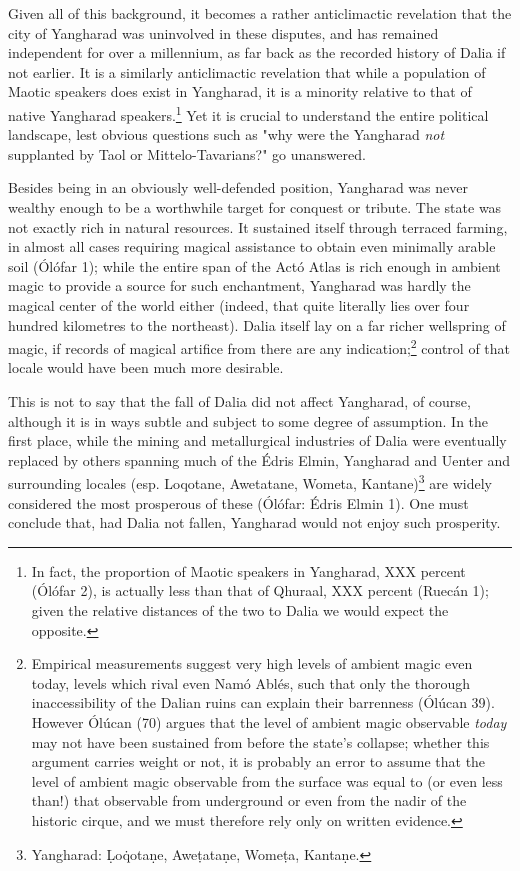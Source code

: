 \documentclass{article}
\begin{document}
{Given all of this background, it becomes a rather anticlimactic revelation that the city of Yangharad was uninvolved in these disputes, and has remained
independent for over a millennium, as far back as the recorded history of Dalia if not earlier. It is a similarly anticlimactic revelation that while a population of Maotic speakers does exist in Yangharad, it is a minority relative to that of native Yangharad speakers.\footnote{In fact, the proportion of Maotic speakers in Yangharad, XXX percent (Ólófar 2), is actually less than that of Qhuraal, XXX percent (Ruecán 1); given the relative distances of the two to Dalia we would expect the opposite.} Yet it is crucial to understand the entire political landscape, lest obvious questions such as "why were the Yangharad \emph{not} supplanted by Taol or Mittelo-Tavarians?" go unanswered.


Besides being in an obviously well-defended position, Yangharad was never
wealthy enough to be a worthwhile target for conquest or tribute. The state was not exactly rich in natural resources. It sustained itself through terraced farming, in almost all cases requiring magical assistance to obtain even minimally arable soil (Ólófar 1); while the entire span of the Actó Atlas is rich enough in ambient magic to provide a source for such enchantment, Yangharad was hardly the magical center of the world either (indeed, that quite literally lies over four hundred kilometres to the northeast). Dalia itself lay on a far richer wellspring of magic, if records of magical artifice from there are any indication;\footnote{Empirical measurements suggest very high levels of ambient magic even today, levels which rival even Namó Ablés, such that only the thorough inaccessibility of the Dalian ruins can explain their barrenness (Ólúcan 39). However Ólúcan (70) argues that the level of ambient magic observable \emph{today} may not have been sustained from before the state's collapse; whether this argument carries weight or not, it is probably an error to assume that the level of ambient magic observable from the surface was equal to (or even less than!) that observable from underground or even from the nadir of the historic cirque, and we must therefore rely only on written evidence.} control of that locale would have been much more desirable.

This is not to say that the fall of Dalia did not affect Yangharad, of course, although it is in ways subtle and subject to some degree of assumption. In the first place, while the mining and metallurgical industries of Dalia were eventually replaced by others spanning much of the Édris Elmin, Yangharad and Uenter and surrounding locales (esp. Loqotane, Awetatane, Wometa, Kantane)\footnote{Yangharad: \d{L}o\.{q}ota\d{n}e, Awe\d{t}ata\d{n}e, Wome\d{t}a, Kanta\d{n}e.} are widely considered the most prosperous of these (Ólófar: Édris Elmin 1). One must conclude that, had Dalia not fallen, Yangharad would not enjoy such prosperity.

}
\end{document}
